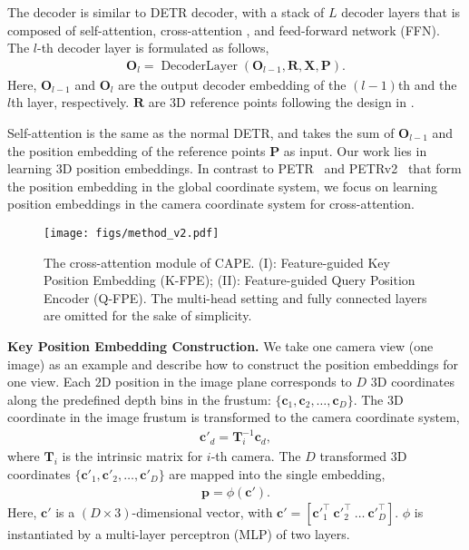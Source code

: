 \documentclass[10pt,twocolumn,letterpaper]{article}
\newcommand{\ourMethod}{CAPE}
\begin{document}
The decoder is similar to DETR decoder, with a stack of $L$ decoder layers
that is composed of
self-attention, cross-attention , and feed-forward network (FFN).
The $l$-th decoder layer is formulated as 
follows,
\begin{align}
\mathbf{O}_{l} = 
\operatorname{DecoderLayer}(\mathbf{O}_{l-1},
\mathbf{R},
\mathbf{X},
\mathbf{P}).
\end{align}
Here,
$\mathbf{O}_{l-1}$ and $\mathbf{O}_{l}$
are the output decoder embedding of the $(l-1)$th and the $l$th layer, respectively.
$\mathbf{R}$ are $3$D reference points following the design in \cite{zhu2020deformable,liu2022petr}.

Self-attention is the same as the normal DETR,
and 
takes the sum of $\mathbf{O}_{l-1}$
and the position embedding of the reference points $\mathbf{P}$ as input.
Our work lies in learning 3D position embeddings.
In contrast to PETR~\cite{liu2022petr} and PETRv2~\cite{liu2022petrv2}
that form the position embedding
in the global coordinate system,
we focus on learning
position embeddings
in the camera coordinate system
for cross-attention.




\begin{figure}[t]
\centering
\texttt{[image: figs/method\_v2.pdf]}
\caption{The cross-attention module of \ourMethod{}. (I): Feature-guided Key Position Embedding (K-FPE); (II): Feature-guided Query Position Encoder (Q-FPE). The multi-head setting and fully connected layers are omitted for the sake of simplicity.}
\centering
\label{fig:transformer}
\vspace{-15pt}
\end{figure}


\vspace{2mm}
\noindent\textbf{Key Position Embedding Construction.}
We take one camera view (one image)
as an example
and describe how to construct the position embeddings
for one view.
Each $2$D position in the image plane
corresponds to $D$ $3$D coordinates along the predefined depth bins in the frustum:
$\{\mathbf{c}_1, \mathbf{c}_2,
\dots, \mathbf{c}_D\}$.
The $3$D coordinate in the image frustum is transformed 
to the camera coordinate system,
\begin{align}\mathbf{c}'_d = \mathbf{T}^{-1}_i\mathbf{c}_d,
\end{align}
where $\mathbf{T}_i$ is the intrinsic matrix for $i$-th camera.
The $D$ transformed $3$D coordinates 
$\{\mathbf{c}'_1, \mathbf{c}'_2,
\dots, \mathbf{c}'_D\}$
are mapped into the single embedding,
\begin{align}
    \mathbf{p}
    = \phi(\mathbf{c}'). 
    \label{eqn:KeyPE}
\end{align}
Here, $\mathbf{c}'$ is a $(D\times 3)$-dimensional vector, with 
$\mathbf{c}' = 
[{\mathbf{c}'}_1^\top~{\mathbf{c}'}_2^\top~\dots~{\mathbf{c}'}_D^\top]$.
$\phi$ is instantiated by a multi-layer perceptron (MLP) of two layers.
\end{document}

